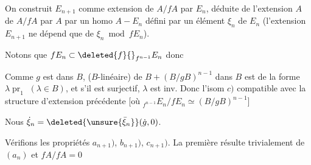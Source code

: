 On construit $E_{n+1}$ comme extension
de $A/fA$ par $E_n$,  déduite de l'extension
  $A$ de $A/fA$ par $A$ par un homo
$A-E_n$ défini par un élément $\xi_n$ de $E_n$
(l'extension $E_{n+1}$ ne dépend que de $\xi_n\bmod fE_n$).

Notons que  $fE_n\subset\deleted{f}{}_{f^{n-1}}E_n$ donc

Comme $g$ est  dans $B$,
($B$-linéaire) de $B+(B/gB)^{n-1}$ dans $B$ est de la
 forme $\lambda\operatorname{pr}_1$ $(\lambda\in B)$, et s'il
 est surjectif, $\lambda$ est inv. Donc l'isom
$c)$  compatible avec la structure
d'extension précédente [où ${}_{f^{n-1}}E_n/fE_n\simeq(B/gB)^{n-1}$]

Nous  $\dot\xi_n=\deleted{\unsure{\bar\xi_n}}(\dot g,0)$. 

Vérifions les propriétés $a_{n+1})$, $b_{n+1})$, $c_{n+1})$.
La première résulte trivialement de $(a_n)$ et $fA/fA=0$

